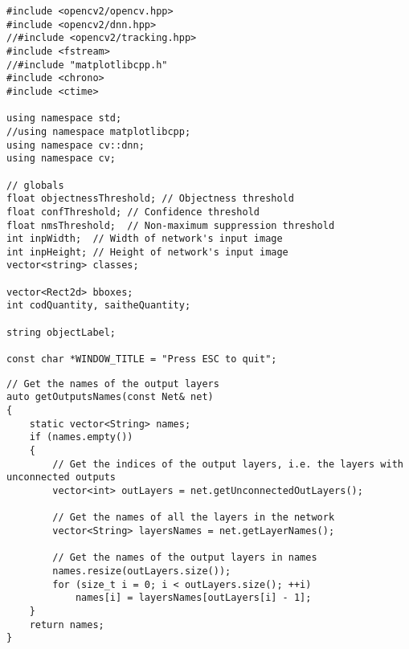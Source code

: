\label{lst:header}
\begin{verbatim}
#include <opencv2/opencv.hpp>
#include <opencv2/dnn.hpp>
//#include <opencv2/tracking.hpp>
#include <fstream>
//#include "matplotlibcpp.h"
#include <chrono>
#include <ctime>

using namespace std;
//using namespace matplotlibcpp;
using namespace cv::dnn;
using namespace cv;

// globals
float objectnessThreshold; // Objectness threshold
float confThreshold; // Confidence threshold
float nmsThreshold;  // Non-maximum suppression threshold
int inpWidth;  // Width of network's input image
int inpHeight; // Height of network's input image
vector<string> classes;

vector<Rect2d> bboxes;
int codQuantity, saitheQuantity;

string objectLabel;

const char *WINDOW_TITLE = "Press ESC to quit";
\end{verbatim}

\label{lst:getOutputsNames}
\begin{verbatim}
// Get the names of the output layers
auto getOutputsNames(const Net& net)
{
    static vector<String> names;
    if (names.empty())
    {
        // Get the indices of the output layers, i.e. the layers with unconnected outputs
        vector<int> outLayers = net.getUnconnectedOutLayers();

        // Get the names of all the layers in the network
        vector<String> layersNames = net.getLayerNames();

        // Get the names of the output layers in names
        names.resize(outLayers.size());
        for (size_t i = 0; i < outLayers.size(); ++i)
            names[i] = layersNames[outLayers[i] - 1];
    }
    return names;
}
\end{verbatim}

